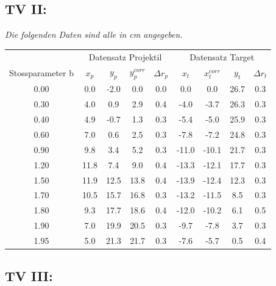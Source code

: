 \documentclass{report}
\begin{document}
\subsection{TV II:}
\textit{Die folgenden Daten sind alle in cm angegeben.}
    \begin{center}
        \begin{tabular}{c|cccc|cccc}
        & \multicolumn{4}{c|}{Datensatz Projektil} & \multicolumn{4}{c}{Datensatz Target} \\
        Stossparameter b 
        & $x_p$ & $y_p$ & $y_p^{corr}$ & $\Delta r_p$ 
        & $x_t$ & $x_t^{corr}$ & $y_t$ & $\Delta r_t$ \\
        \hline
        0.00  & 0.0 & -2.0 & 0.0  & 0.0 & 0.0   & 0.0   & 26.7 & 0.3 \\
        0.30  & 4.0 & 0.9  & 2.9  & 0.4 & -4.0  & -3.7  & 26.3 & 0.3 \\
        0.40  & 4.9 & -0.7 & 1.3  & 0.3 & -5.4  & -5.0  & 25.9 & 0.3 \\
        0.60  & 7.0 & 0.6  & 2.5  & 0.3 & -7.8  & -7.2  & 24.8 & 0.3 \\
        0.90  & 9.8 & 3.4  & 5.2  & 0.3 & -11.0 & -10.1 & 21.7 & 0.3 \\
        1.20  & 11.8 & 7.4 & 9.0  & 0.4 & -13.3 & -12.1 & 17.7 & 0.3 \\
        1.50  & 11.9 & 12.5 & 13.8 & 0.4 & -13.9 & -12.4 & 12.3 & 0.3 \\
        1.70  & 10.5 & 15.7 & 16.8 & 0.3 & -13.2 & -11.5 & 8.5  & 0.3 \\
        1.80  & 9.3 & 17.7 & 18.6 & 0.4 & -12.0 & -10.2 & 6.1  & 0.5 \\
        1.90  & 7.0 & 19.9 & 20.5 & 0.3 & -9.7  & -7.8  & 3.7  & 0.3 \\
        1.95  & 5.0 & 21.3 & 21.7 & 0.3 & -7.6  & -5.7  & 0.5  & 0.4 \\
        \end{tabular}
    \end{center}
\subsection{TV III:}
\end{document}
